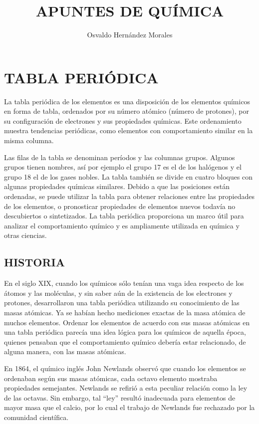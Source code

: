 \documentclass[spanish]{article}
\title{APUNTES DE QUÍMICA \vspace{-1em}}
\author{Osvaldo Hernández Morales}
\date{}
\begin{document}
\maketitle
\vspace{-5em}


\section*{TABLA PERIÓDICA}
La tabla periódica de los elementos es una disposición de los elementos químicos en forma de tabla, ordenados por su número atómico (número de protones), por su configuración de electrones y sus propiedades químicas. Este ordenamiento muestra tendencias periódicas, como elementos con comportamiento similar en la misma columna.

Las filas de la tabla se denominan períodos y las columnas grupos. Algunos grupos tienen nombres, así por ejemplo el grupo 17 es el de los halógenos y el grupo 18 el de los gases nobles. La tabla también se divide en cuatro bloques con algunas propiedades químicas similares. Debido a que las posiciones están ordenadas, se puede utilizar la tabla para obtener relaciones entre las propiedades de los elementos, o pronosticar propiedades de elementos nuevos todavía no descubiertos o sintetizados. La tabla periódica proporciona un marco útil para analizar el comportamiento químico y es ampliamente utilizada en química y otras ciencias.

\subsection*{HISTORIA}

En el siglo XIX, cuando los químicos sólo tenían una vaga idea respecto de los átomos y las  moléculas, y sin saber aún de la existencia de los electrones y protones, desarrollaron una tabla periódica utilizando su conocimiento de las masas atómicas. Ya se habían hecho mediciones exactas de la masa atómica de muchos elementos. Ordenar los elementos de acuerdo con sus masas atómicas en una tabla periódica parecía una idea lógica para los químicos de aquella época, quienes pensaban que el comportamiento químico debería estar relacionado, de alguna
manera, con las masas atómicas.

En 1864, el químico inglés John Newlands observó que cuando los elementos se ordenaban según sus masas atómicas, cada octavo elemento mostraba propiedades semejantes. Newlands se refirió a esta peculiar relación como la ley de las octavas. Sin embargo, tal “ley” resultó inadecuada para elementos de mayor masa que el calcio, por lo cual el trabajo de Newlands fue rechazado por la comunidad científica.
\end{document}
